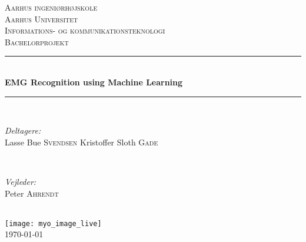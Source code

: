 \documentclass[pdftex, 11pt, a4paper, twoside, danish]{memoir}
\begin{document}
    \begin{titlingpage}
    	\newcommand{\HRule}{\rule{\linewidth}{0.5mm}} %
    	
    	\center %
    	\textsc{\LARGE Aarhus ingeniørhøjskole\\Aarhus Universitet}\\[1.5cm] %
    	\textsc{\Large Informations- og kommunikationsteknologi}\\[0.5cm] %
    	\textsc{\large Bachelorprojekt}\\[0.5cm] %
    	
    	\HRule \\[0.4cm]
    	{ \huge \bfseries EMG Recognition using Machine Learning}\\[0.4cm] %
    	\HRule \\[1.5cm]
    	
    	\begin{minipage}{0.4\textwidth}
    		\begin{flushleft} \large
    			\emph{Deltagere:}\\
    			Lasse Bue \textsc{Svendsen}
    			Kristoffer Sloth \textsc{Gade} %
    		\end{flushleft}
    	\end{minipage}
    	~
    	\begin{minipage}{0.4\textwidth}
    		\begin{flushright} \large
    			\emph{Vejleder:} \\
    			Peter \textsc{Ahrendt} %
    		\end{flushright}
    	\end{minipage}\\[2cm]
    	
    	\texttt{[image: myo\_image\_live]}\\[1.5cm] %
    	
    	{\large \today}\\[1cm] %
    	
    	\vfill %
    \end{titlingpage}
    
\end{document}
